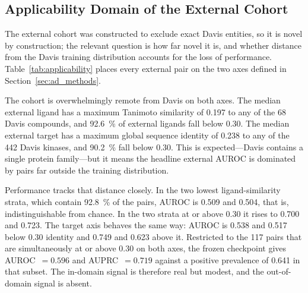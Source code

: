 \documentclass[fleqn,10pt]{wlscirep}
\begin{document}
\begin{table}[htbp]
\centering
\caption{Frozen external evaluation on both BindingDB cohorts. Both use the same
  \texttt{best\_random} checkpoint, the same frozen Davis threshold of
  0.5959881544, and the same exact-$K_d$ double-novel protocol; they differ only
  in the source snapshot. Intervals are 600-replicate pair-stratified bootstrap
  95\% confidence intervals with seed 42.}
\label{tab:bindingdb_external}
\end{table}

\subsection{Applicability Domain of the External Cohort}
\label{sec:applicability}

The external cohort was constructed to exclude exact Davis entities, so it is
novel by construction; the relevant question is how far novel it is, and whether
distance from the Davis training distribution accounts for the loss of
performance.  Table~\ref{tab:applicability} places every external pair on the
two axes defined in Section~\ref{sec:ad_methods}.

The cohort is overwhelmingly remote from Davis on both axes.  The median
external ligand has a maximum Tanimoto similarity of 0.197 to any of the 68
Davis compounds, and \SI{92.6}{\percent} of external ligands fall below 0.30.
The median external target has a maximum global sequence identity of 0.238 to
any of the 442 Davis kinases, and \SI{90.2}{\percent} fall below 0.30.  This is
expected---Davis contains a single protein family---but it means the headline
external AUROC is dominated by pairs far outside the training distribution.

Performance tracks that distance closely.  In the two lowest ligand-similarity
strata, which contain \SI{92.8}{\percent} of the pairs, AUROC is 0.509 and
0.504, that is, indistinguishable from chance.  In the two strata at or above
0.30 it rises to 0.700 and 0.723.  The target axis behaves the same way: AUROC
is 0.538 and 0.517 below 0.30 identity and 0.749 and 0.623 above it.  Restricted
to the 117 pairs that are simultaneously at or above 0.30 on both axes, the
frozen checkpoint gives AUROC~$=0.596$ and AUPRC~$=0.719$ against a positive
prevalence of 0.641 in that subset.  The in-domain signal is therefore real but
modest, and the out-of-domain signal is absent.
\end{document}
